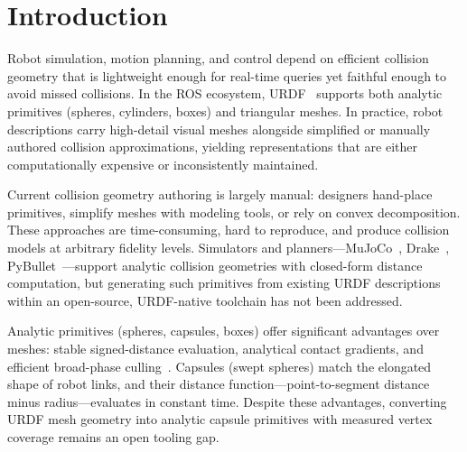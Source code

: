 \section{Introduction}
\label{sec:intro}

Robot simulation, motion planning, and control depend on efficient collision geometry that is lightweight enough for real-time queries yet faithful enough to avoid missed collisions.
In the ROS ecosystem, URDF~\cite{urdf_doc} supports both analytic primitives (spheres, cylinders, boxes) and triangular meshes.
In practice, robot descriptions carry high-detail visual meshes alongside simplified or manually authored collision approximations, yielding representations that are either computationally expensive or inconsistently maintained.

Current collision geometry authoring is largely manual: designers hand-place primitives, simplify meshes with modeling tools, or rely on convex decomposition.
These approaches are time-consuming, hard to reproduce, and produce collision models at arbitrary fidelity levels.
Simulators and planners---MuJoCo~\cite{todorov2012mujoco}, Drake~\cite{drake}, PyBullet~\cite{coumans2018pybullet}---support analytic collision geometries with closed-form distance computation, but generating such primitives from existing URDF descriptions within an open-source, URDF-native toolchain has not been addressed.

Analytic primitives (spheres, capsules, boxes) offer significant advantages over meshes: stable signed-distance evaluation, analytical contact gradients, and efficient broad-phase culling~\cite{pan2012fcl}.
Capsules (swept spheres) match the elongated shape of robot links, and their distance function---point-to-segment distance minus radius---evaluates in constant time.
Despite these advantages, converting URDF mesh geometry into analytic capsule primitives with measured vertex coverage remains an open tooling gap.

